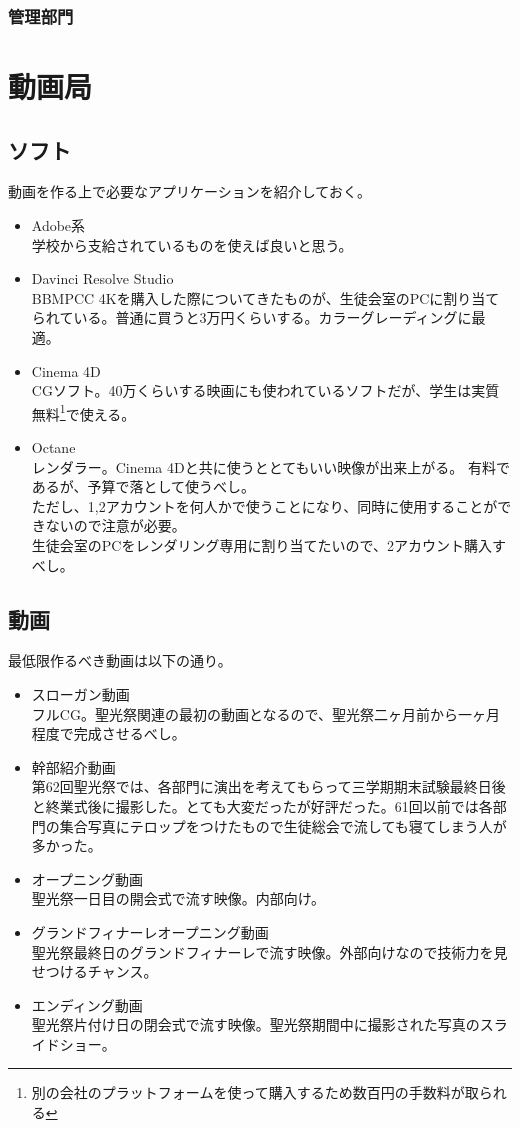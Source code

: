 \documentclass[dvipdfmx,jb5]{jarticle}
\begin{document}
\subsubsection{管理部門}

\section{動画局}
\subsection{ソフト}
 動画を作る上で必要なアプリケーションを紹介しておく。
 \begin{itemize}
  \item Adobe系\\
  学校から支給されているものを使えば良いと思う。
  \item Davinci Resolve Studio\\
  BBMPCC 4Kを購入した際についてきたものが、生徒会室のPCに割り当てられている。普通に買うと3万円くらいする。カラーグレーディングに最適。
  \item Cinema 4D\\
  CGソフト。40万くらいする映画にも使われているソフトだが、学生は実質無料\footnote{別の会社のプラットフォームを使って購入するため数百円の手数料が取られる}で使える。
  \item Octane\\
  レンダラー。Cinema 4Dと共に使うととてもいい映像が出来上がる。
  有料であるが、予算で落として使うべし。\\ただし、1,2アカウントを何人かで使うことになり、同時に使用することができないので注意が必要。\\生徒会室のPCをレンダリング専用に割り当てたいので、2アカウント購入すべし。
 \end{itemize}
\subsection{動画}
最低限作るべき動画は以下の通り。
 \begin{itemize}
  \item スローガン動画\\
  フルCG。聖光祭関連の最初の動画となるので、聖光祭二ヶ月前から一ヶ月程度で完成させるべし。
  \item 幹部紹介動画\\
  第62回聖光祭では、各部門に演出を考えてもらって三学期期末試験最終日後と終業式後に撮影した。とても大変だったが好評だった。61回以前では各部門の集合写真にテロップをつけたもので生徒総会で流しても寝てしまう人が多かった。

  \item オープニング動画\\
  聖光祭一日目の開会式で流す映像。内部向け。
  \item グランドフィナーレオープニング動画\\
  聖光祭最終日のグランドフィナーレで流す映像。外部向けなので技術力を見せつけるチャンス。
  \item エンディング動画\\
  聖光祭片付け日の閉会式で流す映像。聖光祭期間中に撮影された写真のスライドショー。
 \end{itemize}
 \newpage
\end{document}
